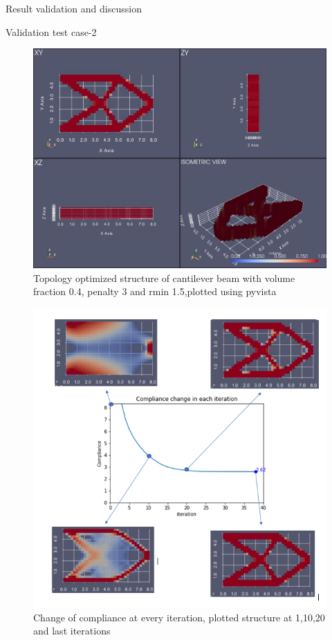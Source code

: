 \documentclass[a4paper,12pt,times]{article}
\begin{document}
\begin{section}{Result validation and discussion}
\begin{subsection}{Validation test case-2}
\begin{figure}[H]
\centering
\includegraphics[width=1\linewidth]{Numerical_result_full_MMA_02.jpg}
\centering
\caption{Topology optimized structure of cantilever beam with volume fraction 0.4, penalty 3 and rmin 1.5,plotted using pyvista}
\label{VC-03.3}
\end{figure}
\begin{figure}[H]
\centering
\includegraphics[width=1\linewidth]{Compliance_chg_MMA_02.png}
\centering
\caption{Change of compliance at every iteration, plotted structure at 1,10,20 and last iterations}


\end{figure}
\end{subsection}
\end{section}
\end{document}
